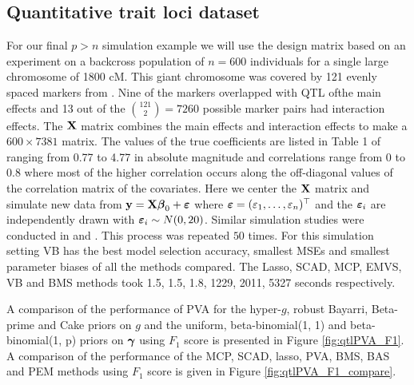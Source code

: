 \subsection{Quantitative trait loci dataset}
\label{sec:QTL}

	For our final $p>n$ simulation example we will use the design matrix based on an
experiment on a backcross population of $n=600$ individuals for a single large 
chromosome of 1800 cM. This giant chromosome was covered by 121 evenly 
spaced markers from \cite{Xu2007}. Nine of the markers overlapped with QTL ofthe main effects 
and 13 out of the ${121 \choose 2} = 7260$ possible marker pairs had interaction 
effects. The ${\bf X}$ matrix combines the main effects and interaction effects to
make a $600\times 7381$ matrix. The values of the true coefficients are listed in 
Table 1 of \cite{Xu2007} ranging from 0.77 to 4.77 in absolute magnitude and
correlations range from 0 to 0.8 where most of the higher correlation occurs
along the off-diagonal values of the correlation matrix of the covariates. Here
we center the ${\bf X}$ matrix and simulate new data from ${\bf y} = {\bf X}{\boldsymbol \beta}_0 + {\boldsymbol \varepsilon}$
where ${\boldsymbol \varepsilon} = (\varepsilon_1,\ldots,\varepsilon_n)^\top$ and the ${\boldsymbol \varepsilon}_i$
are independently drawn with ${\boldsymbol \varepsilon}_i \sim N(0,20)$. Similar simulation
studies were conducted in \cite{Xu2007} and \cite{Karkkainen2012}. This
process was repeated $50$ times.
For this simulation setting VB has the best model selection accuracy,
smallest MSEs and smallest parameter biases of all the methods compared.
The Lasso, SCAD, MCP, EMVS, VB and BMS methods took 1.5, 1.5, 1.8, 1229, 2011, 5327
seconds respectively.

A comparison of the performance of PVA for the hyper-$g$, robust Bayarri, Beta-prime and Cake priors on $g$
and the uniform, beta-binomial(1, 1) and beta-binomial(1, p) priors on ${\boldsymbol \gamma}$ using $F_1$ score is
presented in Figure \ref{fig:qtlPVA_F1}. A comparison of the performance of the MCP, SCAD, lasso, PVA, BMS,
BAS and PEM  methods using $F_1$ score is given in Figure \ref{fig:qtlPVA_F1_compare}.

